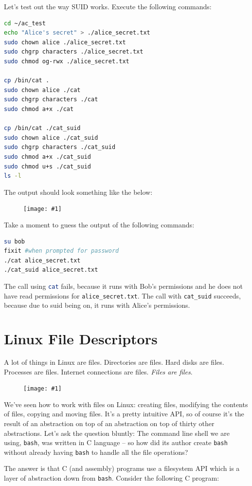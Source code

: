 \documentclass{article}
\newcommand{\displayimage}[1] {
\begin{figure}[H]
    \centering
    \texttt{[image: \#1]} 
\end{figure}
}
\newcommand{\wrapimageright}[1] {
    \begin{figure}
        \begin{center}
            \texttt{[image: \#1]} 
        \end{center}
    \end{figure}
}
\newcommand{\xcode}[2]{\colorbox{ubuntuback}{\lstinline[language=#1]|#2|}}
\newcommand{\code}[1]{\colorbox{ubuntuback}{\texttt{#1}}}
\begin{document}
Let's test out the way SUID works. Execute the following commands:

\begin{lstlisting}[language=bash]
cd ~/ac_test
echo "Alice's secret" > ./alice_secret.txt
sudo chown alice ./alice_secret.txt
sudo chgrp characters ./alice_secret.txt
sudo chmod og-rwx ./alice_secret.txt

cp /bin/cat .
sudo chown alice ./cat
sudo chgrp characters ./cat
sudo chmod a+x ./cat

cp /bin/cat ./cat_suid
sudo chown alice ./cat_suid
sudo chgrp characters ./cat_suid
sudo chmod a+x ./cat_suid
sudo chmod u+s ./cat_suid
ls -l
\end{lstlisting}

The output should look something like the below: 

\displayimage{./images/alice_bob_suid.png}

Take a moment to guess the output of the following commands:

\begin{lstlisting}[language=bash]
su bob
fixit #when prompted for password
./cat alice_secret.txt
./cat_suid alice_secret.txt
\end{lstlisting}

The call using \xcode{bash}{cat} fails, because it runs with Bob's permissions and he does not have read permissions for \code{alice\_secret.txt}. The call with \code{cat\_suid} succeeds, because due to suid being on, it runs with Alice's permissions.

\section{Linux File Descriptors}

A lot of things in Linux are files. Directories are files. Hard disks are files. Processes are files. Internet connections are files. \textit{Files are files}.

\wrapimageright{./images/file_descriptors.png}
We've seen how to work with files on Linux: creating files, modifying the contents of files, copying and moving files. It's a pretty intuitive API, so of course it's the result of an abstraction on top of an abstraction on top of thirty other abstractions. Let's ask the question bluntly: The command line shell we are using, \code{bash}, was written in C language -- so how did its author create \code{bash} without already having \code{bash} to handle all the file operations?

The answer is that C (and assembly) programs use a filesystem API which is a layer of abstraction down from \code{bash}. Consider the following C program: 
\end{document}
